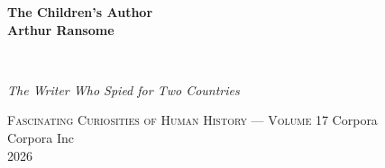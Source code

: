 \clearpage
\vspace*{1.5in}
\begin{center}
  \begin{minipage}{\textwidth}
    \centering
    \Huge\bfseries
    \linespread{1.25}\selectfont
    The Children's Author\\[0.5em]
    Arthur Ransome
  \end{minipage}
  \\[3em]
  {\Large\itshape\linespread{1.3}\selectfont
  The Writer Who Spied for Two Countries\par}
  \vspace{2em}
  {\small\scshape Fascinating Curiosities of Human History — Volume 17}
  \vfill
  {\large Corpora}
  \\[1em]
  {\large Corpora Inc}
  \\[1em]
  {\large 2026}
\end{center}
\clearpage
